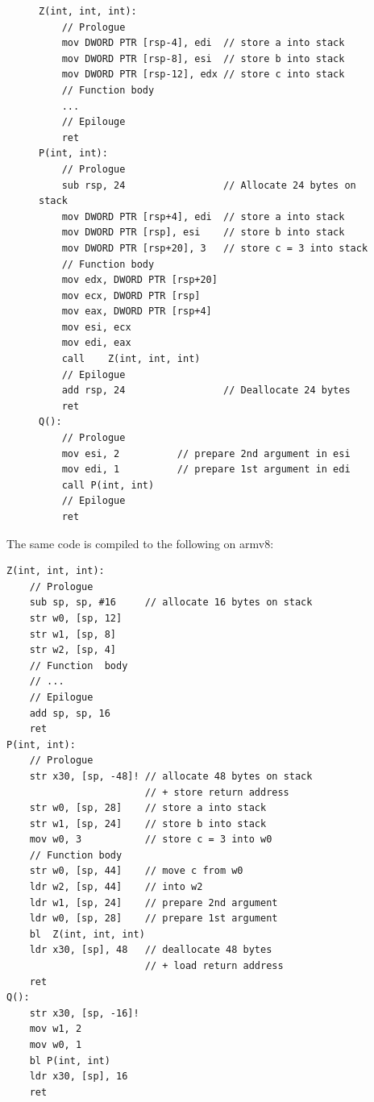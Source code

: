 \documentclass[11pt]{memoir}
\newenvironment{code}[0]{\begin{floatcode}[tb]}{\end{floatcode}}
\begin{document}
\begin{figure}[ht]
\begin{verbatim}
Z(int, int, int):
    // Prologue
    mov DWORD PTR [rsp-4], edi  // store a into stack
    mov DWORD PTR [rsp-8], esi  // store b into stack 
    mov DWORD PTR [rsp-12], edx // store c into stack
    // Function body
    ...
    // Epilouge
    ret
P(int, int):
    // Prologue
    sub rsp, 24                 // Allocate 24 bytes on stack
    mov DWORD PTR [rsp+4], edi  // store a into stack   
    mov DWORD PTR [rsp], esi    // store b into stack 
    mov DWORD PTR [rsp+20], 3   // store c = 3 into stack
    // Function body
    mov edx, DWORD PTR [rsp+20]
    mov ecx, DWORD PTR [rsp]
    mov eax, DWORD PTR [rsp+4]
    mov esi, ecx
    mov edi, eax
    call    Z(int, int, int)    
    // Epilogue
    add rsp, 24                 // Deallocate 24 bytes
    ret
Q():
    // Prologue
    mov esi, 2          // prepare 2nd argument in esi 
    mov edi, 1          // prepare 1st argument in edi 
    call P(int, int)
    // Epilogue
    ret
\end{verbatim}
\end{figure}

The same code is compiled to the following on armv8:
\begin{code}
\begin{verbatim}
Z(int, int, int):
    // Prologue
    sub sp, sp, #16     // allocate 16 bytes on stack
    str w0, [sp, 12]
    str w1, [sp, 8]
    str w2, [sp, 4]
    // Function  body
    // ...
    // Epilogue
    add sp, sp, 16
    ret
P(int, int):
    // Prologue
    str x30, [sp, -48]! // allocate 48 bytes on stack 
                        // + store return address
    str w0, [sp, 28]    // store a into stack
    str w1, [sp, 24]    // store b into stack
    mov w0, 3           // store c = 3 into w0
    // Function body
    str w0, [sp, 44]    // move c from w0
    ldr w2, [sp, 44]    // into w2
    ldr w1, [sp, 24]    // prepare 2nd argument
    ldr w0, [sp, 28]    // prepare 1st argument
    bl  Z(int, int, int)
    ldr x30, [sp], 48   // deallocate 48 bytes 
                        // + load return address
    ret
Q():
    str x30, [sp, -16]!
    mov w1, 2
    mov w0, 1
    bl P(int, int)
    ldr x30, [sp], 16
    ret
\end{verbatim}
\label{lst:example-arm}
\end{code}
\end{document}
